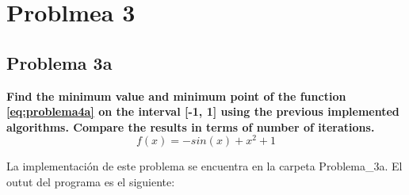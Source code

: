 \section*{Problmea 3}
\subsection*{Problema 3a}
\textbf{Find the minimum value and minimum point of the function \ref{eq:problema4a} on the interval [-1, 1] using the previous implemented algorithms. Compare the results in terms of number of iterations.}
\begin{equation}
    f(x) = -sin(x)+x^2+1
    \label{eq:problema4a}
\end{equation}

La implementación de este problema se encuentra en la carpeta \textcolor{citecolor}{Problema\_3a}. El outut del programa es el siguiente:

